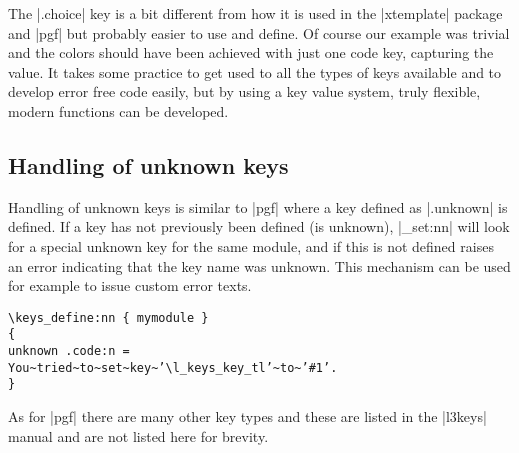 The |.choice|  key is a bit different from how it is used in the |xtemplate| package and |pgf| but probably easier to use and define. Of course our example was trivial and the colors should have been achieved with just one code key, capturing the value. It takes some practice to get used to all the types of keys available and to develop error free code easily, but by using a key value system, truly flexible, modern functions can be developed.
 

\subsection{Handling of unknown keys}
 
 Handling of unknown keys is similar to |pgf| where a key defined as |.unknown| is defined. 
 If a key has not previously been defined (is unknown), |\keys_set:nn| will look for a special
unknown key for the same module, and if this is not defined raises an error indicating that
the key name was unknown. This mechanism can be used for example to issue custom
error texts.

\begin{verbatim}
\keys_define:nn { mymodule }
{
unknown .code:n =
You~tried~to~set~key~’\l_keys_key_tl’~to~’#1’.
}
\end{verbatim}
 
 
 As for |pgf| there are many other key types and these are listed in the |l3keys| manual and are not listed here for brevity. 
 
 